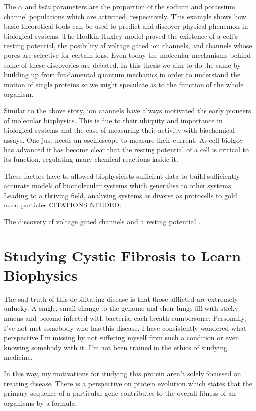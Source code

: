 The $\alpha$ and $beta$ parameters are the proportion of the sodium and potassium channel populations which are activated, respecitively.  This example shows how basic theoretical tools can be used to predict and discover physical phenemon in biological systems. The Hodkin Huxley model proved the existence of a cell's resting potential, the posibility of voltage gated ion channels, and channels whose pores are selective for certain ions. Even today the molecular mechanisms behind some of these discoveries are debated. In this thesis we aim to do the same by building up from fundamental quantum mechanics in order to understand the motion of single proteins so we might speculate as to the function of the whole organism.

Similar to the above story, ion channels have always motivated the early pioneers of molecular biophysics. This is due to their ubiquity and importance in biological systems and the ease of measuring their activity with biochemical assays. One just needs an oscilloscope to measure their current. As cell biolgoy has advanced it has become clear that the resting potential of a cell is critical to its function, regulating many chemical reactions inside it.


These factors have to allowed biophysicists sufficient data to build sufficiently accurate models of biomolecular systems which generalise to other systems. Leading to a thriving field, analysing systems as diverse as protocells to gold nano particles CITATIONS NEEDED.

The discovery of voltage gated channels and a resting potential .



\section{Studying Cystic Fibrosis to Learn Biophysics}

The sad truth of this debilitating disease is that those afflicted are extremely unlucky. A single, small change to the genome and their lungs fill with sticky mucus and become infected with bacteria, each breath cumbersome. Personally, I've not met somebody who has this disease. I have consistently wondered what perspective I'm missing by not suffering myself from such a condition or even knowing somebody with it. I'm not been trained in the ethics of studying medicine.

In this way, my motivations for studying this protein aren't solely focussed on treating disease. There is a perspective on protein evolution which states that the primary sequence of a particular gene contributes to the overall fitness of an organisms by a formula. \cite{}


